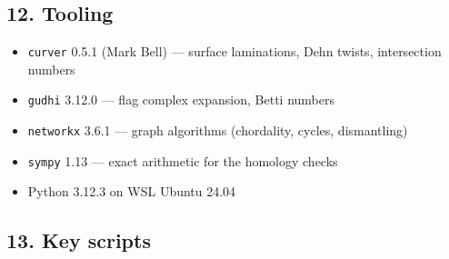 \documentclass[
]{article}
\providecommand{\tightlist}{%
  \setlength{\itemsep}{0pt}\setlength{\parskip}{0pt}}
\begin{document}
\subsection{12. Tooling}\label{tooling}

\begin{itemize}
\tightlist
\item
  \texttt{curver} 0.5.1 (Mark Bell) --- surface laminations, Dehn
  twists, intersection numbers
\item
  \texttt{gudhi} 3.12.0 --- flag complex expansion, Betti numbers
\item
  \texttt{networkx} 3.6.1 --- graph algorithms (chordality, cycles,
  dismantling)
\item
  \texttt{sympy} 1.13 --- exact arithmetic for the homology checks
\item
  Python 3.12.3 on WSL Ubuntu 24.04
\end{itemize}

\subsection{13. Key scripts}\label{key-scripts}
\end{document}
